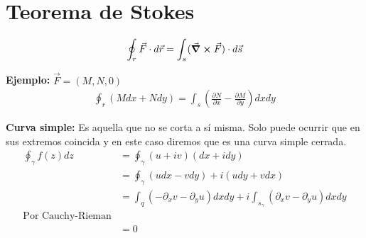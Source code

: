 \documentclass{article}
\newcommand{\caja}[3]{%
  \begin{tcolorbox}[colback=#1!5!white,colframe=#1!25!black,title=#2]
    #3
  \end{tcolorbox}%
}
\begin{document}
\section{Teorema de Stokes }
\caja{green}{}{
  \begin{gather*}
    \displaystyle\oint_{r }^{}\vec F \cdot d\vec r = \displaystyle\int_{s }^{} (\vec \grad \cross \vec F )\cdot d\vec s  
  \end{gather*}
}
\textbf{Ejemplo: } $ \vec F = (M,N,0 ) $
\begin{gather*}
  \displaystyle\oint_{r }^{} (Mdx + Ndy) = \displaystyle\int_{s }^{}\left(\frac{\partial N  }{\partial x } - \frac{\partial M  }{\partial y}\right)dxdy 
\end{gather*}

\textbf{Curva simple:} Es aquella que no se corta a sí misma. Solo puede ocurrir que en sus extremos coincida y en este caso diremos que es una curva simple cerrada.
\begin{align*}
  \displaystyle\oint_{\gamma}^{}f(z)dz &= \displaystyle\oint_{\gamma}^{} (u+iv)(dx+idy)\\
  &= \displaystyle\oint_{\gamma}^{} (udx-vdy)+ i (udy+vdx)\\
  &= \displaystyle\int_{q }^{}(-\partial_x v - \partial_y u )dxdy + i \displaystyle\int_{s_\gamma}^{}(\partial_x v - \partial_y u )dxdy \\
  \text{Por Cauchy-Rieman}\\
  &=0
\end{align*}
\end{document}
